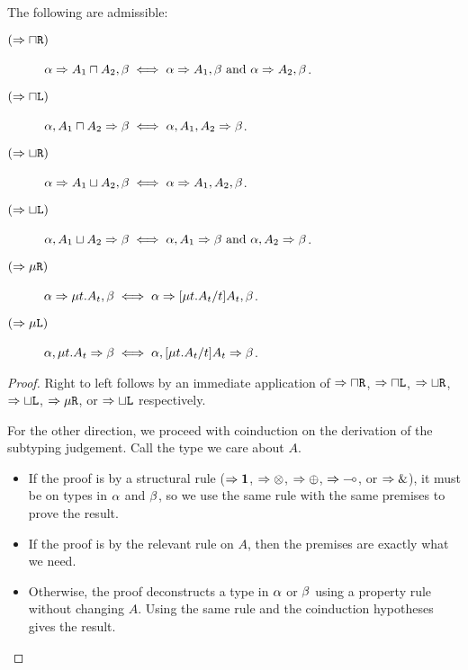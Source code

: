 \begin{lemma}[Invertibility]
  \label{refinements:subtyping-inversion}
  The following are admissible:
  \begin{description}
    \item[$(\mathrel\Rightarrow{\mathbin{\sqcap}\texttt{R}})$] $\alpha \mathrel\Rightarrow A_1 \mathbin{\sqcap} A_2, \beta \iff  \alpha \mathrel\Rightarrow A_1, \beta \text{ and } \alpha \mathrel\Rightarrow A_2, \beta$.
    \item[$(\mathrel\Rightarrow{\mathbin{\sqcap}\texttt{L}})$] $\alpha, A_1 \mathbin{\sqcap} A_2 \mathrel\Rightarrow \beta \iff \alpha, A_1, A_2 \mathrel\Rightarrow \beta$.

    \item[$(\mathrel\Rightarrow{\mathbin{\sqcup}\texttt{R}})$] $\alpha \mathrel\Rightarrow A_1 \mathbin{\sqcup} A_2, \beta \iff \alpha \mathrel\Rightarrow A_1, A_2, \beta$.
    \item[$(\mathrel\Rightarrow{\mathbin{\sqcup}\texttt{L}})$] $\alpha, A_1 \mathbin{\sqcup} A_2 \mathrel\Rightarrow \beta \iff  \alpha, A_1 \mathrel\Rightarrow \beta \text{ and } \alpha, A_2 \mathrel\Rightarrow \beta$.

    \item[$(\mathrel\Rightarrow{\mu\texttt{R}})$] $\alpha \mathrel\Rightarrow \mu{t} . {A_t}, \beta \iff \alpha \mathrel\Rightarrow \lbrack{\mu{t} . {A_t}}/{t}\rbrack{A_t}, \beta$.
    \item[$(\mathrel\Rightarrow{\mu\texttt{L}})$] $\alpha, \mu{t} . {A_t} \mathrel\Rightarrow \beta \iff \alpha, \lbrack{\mu{t} . {A_t}}/{t}\rbrack{A_t} \mathrel\Rightarrow \beta$.
  \end{description}
\end{lemma}
\begin{proof}
  Right to left follows by an immediate application of $\mathrel\Rightarrow{\mathbin{\sqcap}\texttt{R}}$, $\mathrel\Rightarrow{\mathbin{\sqcap}\texttt{L}}$, $\mathrel\Rightarrow{\mathbin{\sqcup}\texttt{R}}$, $\mathrel\Rightarrow{\mathbin{\sqcup}\texttt{L}}$, $\mathrel\Rightarrow{\mu\texttt{R}}$, or $\mathrel\Rightarrow{\mathbin{\sqcup}\texttt{L}}$ respectively.

  For the other direction, we proceed with coinduction on the derivation of the subtyping judgement. Call the type we care about $A$.
  \begin{itemize}
    \item If the proof is by a structural rule ($\mathrel\Rightarrow{\mathbf{1}}$, $\mathrel\Rightarrow{\otimes}$, $\mathrel\Rightarrow{\oplus}$, $\mathrel\Rightarrow{\multimap}$, or $\mathrel\Rightarrow{\&}$), it must be on types in $\alpha$ and $\beta$, so we use the same rule with the same premises to prove the result.
    \item If the proof is by the relevant rule on $A$, then the premises are exactly what we need.
    \item Otherwise, the proof deconstructs a type in $\alpha$ or $\beta$ using a property rule without changing $A$. Using the same rule and the coinduction hypotheses gives the result.
  \end{itemize}
\end{proof}

